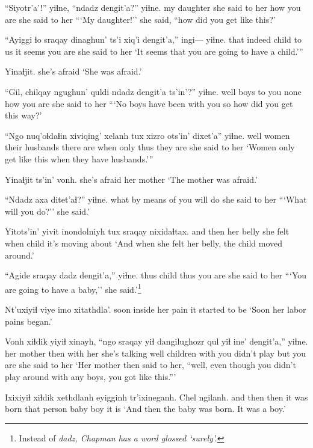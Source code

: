 \documentclass[12pt]{article}
\begin{document}
\gll ``Siyotr'a'!'' yiɬne, ``ndadz dengit'a?'' yiɬne.
{my daughter} {she said to her} how {you are} {she said to her}
\glt ```My daughter!'' she said, ``how did you get like this?'
\glend

\gll ``Ayiggi ɬo sraqay dinaghun' ts'i xiq'i dengit'a,'' ingi--- yiɬne.
that indeed child {to us} {} {it seems} {you are} {} {she said to her}
\glt `It seems that you are going to have a child.''' 
\glend

\gll Yinaɬjit.
{{she's afraid}}
\glt `She was afraid.'
\glend

\gll ``Gil,  chilqay ngughun' quldi ndadz dengit'a ts'in'?'' yiɬne.
well  boys  {to you}  none how {you are} {} {she said to her}
\glt ```No boys have been with you so how did you get this way?'
\glend

\gll ``Ngo nuq'oɬdaɬin xiviqing' xelanh tux xizro ots'in' dixet'a'' yiɬne.
well women {their husbands} {there are} when only thus {they are} {she said to her}
\glt `Women only get like this when they have husbands.'''
\glend

\gll Yinaɬjit ts'in' vonh.
{she's afraid} {} {her mother}
\glt `The mother was afraid.'
\glend

\gll ``Ndadz axa ditet'aɬ?'' yiɬne.
what {by means of} {you will do} {she said to her}
\glt ```What will you do?'' she said.'
\glend

\gll Yitots'in' yivit  inondolniyh tux sraqay nixidaɬtax.
{and then} {her belly} {she felt} when child {it's moving about}
\glt `And when she felt her belly, the child moved around.'
\glend

\gll ``Agide sraqay dadz dengit'a,'' yiɬne.
thus child thus {you are} {she said to her}
\glt ```You are going to have a baby,'' she said.'\footnote{Instead of \em dadz\em, Chapman has a word glossed `surely'.}
\glend

\gll Nt'uxiyiɬ viye imo xitathdla'.
soon {inside her} pain {it started to be}
\glt `Soon her labor pains began.'
\glend

\gll Vonh  xiɬdik yiyiɬ  xinayh, ``ngo sraqay  yiɬ {dangilughozr qul} yiɬ ine' dengit'a,'' yiɬne.
{her mother} then {with her} {she's talking} well children with {you didn't play} {} but {you are} {she said to her}
\glt `Her mother then said to her, ``well, even though you didn't play around with any boys, you got like this.'''
\glend

\gll Ixixiyiɬ xiɬdik  xethdlanh eyigginh tr'ixineganh. Chel ngilanh.
{and then} then {it was born} {that person}  baby  boy {it is}
\glt `And then the baby was born. It was a boy.'
\glend
\end{document}
